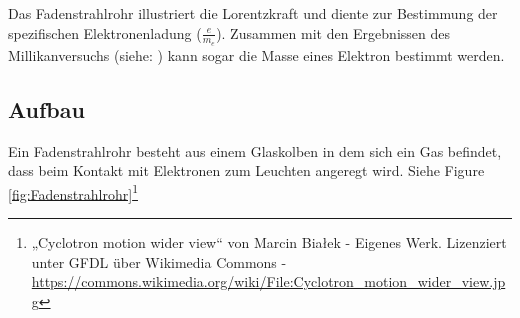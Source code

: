 




%
%	





Das Fadenstrahlrohr illustriert die Lorentzkraft und diente zur Bestimmung der spezifischen Elektronenladung ($\frac{e}{m_e}$). Zusammen mit den Ergebnissen des Millikanversuchs (siehe: ) kann sogar die Masse eines Elektron bestimmt werden.

\subsection{Aufbau}

Ein Fadenstrahlrohr besteht aus einem Glaskolben in dem sich ein Gas befindet, dass beim Kontakt mit Elektronen zum Leuchten angeregt wird. Siehe Figure \ref{fig:Fadenstrahlrohr}\footnote{„Cyclotron motion wider view“ von Marcin Białek - Eigenes Werk. Lizenziert unter GFDL über Wikimedia Commons - \url{https://commons.wikimedia.org/wiki/File:Cyclotron\_motion\_wider\_view.jpg}}

